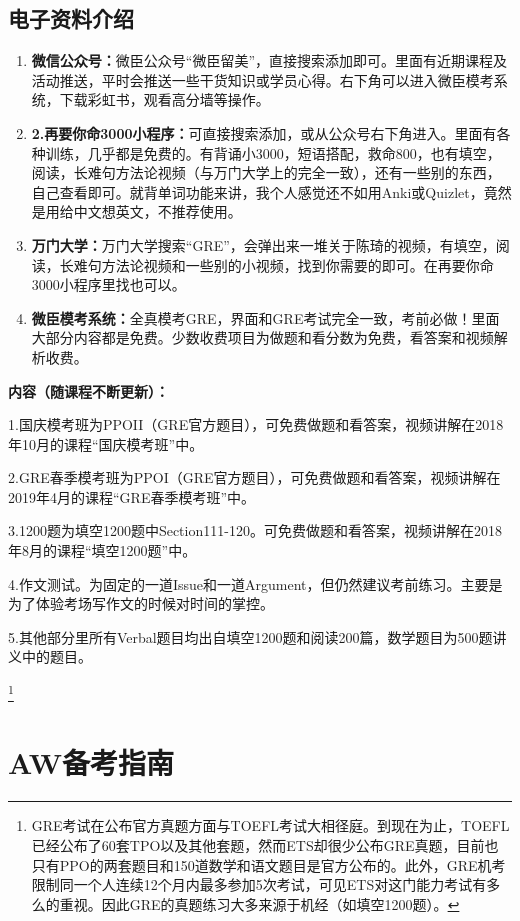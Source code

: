 \documentclass[cn,plain]{./src/qyxfbook}
\begin{document}
		\section{电子资料介绍}
		\begin{enumerate}
			\item \textbf{微信公众号：}微臣公众号“微臣留美”，直接搜索添加即可。里面有近期课程及活动推送，平时会推送一些干货知识或学员心得。右下角可以进入微臣模考系统，下载彩虹书，观看高分墙等操作。
			\item \textbf{2.再要你命3000小程序：}可直接搜索添加，或从公众号右下角进入。里面有各种训练，几乎都是免费的。有背诵小3000，短语搭配，救命800，也有填空，阅读，长难句方法论视频（与万门大学上的完全一致），还有一些别的东西，自己查看即可。就背单词功能来讲，我个人感觉还不如用Anki或Quizlet，竟然是用给中文想英文，不推荐使用。
			\item 	\textbf{万门大学：}万门大学搜索“GRE”，会弹出来一堆关于陈琦的视频，有填空，阅读，长难句方法论视频和一些别的小视频，找到你需要的即可。在再要你命3000小程序里找也可以。
			\item 	\textbf{微臣模考系统：}全真模考GRE，界面和GRE考试完全一致，考前必做！里面大部分内容都是免费。少数收费项目为做题和看分数为免费，看答案和视频解析收费。
		\end{enumerate}
		
			\textbf{内容（随课程不断更新）：}\par
			
			1.国庆模考班为PPOII（GRE官方题目），可免费做题和看答案，视频讲解在2018年10月的课程“国庆模考班”中。\par
			2.GRE春季模考班为PPOI（GRE官方题目），可免费做题和看答案，视频讲解在2019年4月的课程“GRE春季模考班”中。\par
			3.1200题为填空1200题中Section111-120。可免费做题和看答案，视频讲解在2018年8月的课程“填空1200题”中。\par
			4.作文测试。为固定的一道Issue和一道Argument，但仍然建议考前练习。主要是为了体验考场写作文的时候对时间的掌控。\par
			5.其他部分里所有Verbal题目均出自填空1200题和阅读200篇，数学题目为500题讲义中的题目。

			
			\footnote{GRE考试在公布官方真题方面与TOEFL考试大相径庭。到现在为止，TOEFL已经公布了60套TPO以及其他套题，然而ETS却很少公布GRE真题，目前也只有PPO的两套题目和150道数学和语文题目是官方公布的。此外，GRE机考限制同一个人连续12个月内最多参加5次考试，可见ETS对这门能力考试有多么的重视。因此GRE的真题练习大多来源于机经（如填空1200题）。
		}
	

\chapter{AW备考指南}
\end{document}
